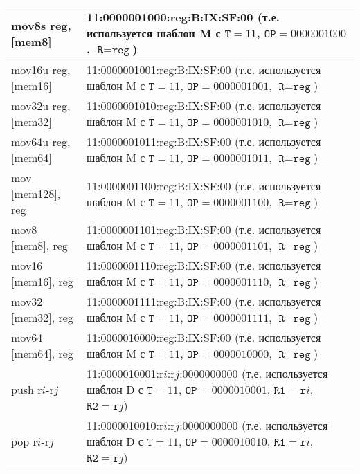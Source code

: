 \documentclass[10pt]{report}
\begin{document}
\begin{longtable}[c]{|l|p{12.5cm}|}
mov8s reg, [mem8]    & 11:0000001000:reg:B:IX:SF:00 (т.е. используется шаблон M с $\texttt{T}=11$, $\texttt{OP}=0000001000$, $\texttt{R}=\texttt{reg}$)\\ \hline
mov16u reg, [mem16]  & 11:0000001001:reg:B:IX:SF:00 (т.е. используется шаблон M с $\texttt{T}=11$, $\texttt{OP}=0000001001$, $\texttt{R}=\texttt{reg}$)\\ \hline
mov32u reg, [mem32]  & 11:0000001010:reg:B:IX:SF:00 (т.е. используется шаблон M с $\texttt{T}=11$, $\texttt{OP}=0000001010$, $\texttt{R}=\texttt{reg}$)\\ \hline
mov64u reg, [mem64]  & 11:0000001011:reg:B:IX:SF:00 (т.е. используется шаблон M с $\texttt{T}=11$, $\texttt{OP}=0000001011$, $\texttt{R}=\texttt{reg}$)\\ \hline
mov [mem128], reg    & 11:0000001100:reg:B:IX:SF:00 (т.е. используется шаблон M с $\texttt{T}=11$, $\texttt{OP}=0000001100$, $\texttt{R}=\texttt{reg}$)\\ \hline
mov8 [mem8], reg     & 11:0000001101:reg:B:IX:SF:00 (т.е. используется шаблон M с $\texttt{T}=11$, $\texttt{OP}=0000001101$, $\texttt{R}=\texttt{reg}$)\\ \hline
mov16 [mem16], reg   & 11:0000001110:reg:B:IX:SF:00 (т.е. используется шаблон M с $\texttt{T}=11$, $\texttt{OP}=0000001110$, $\texttt{R}=\texttt{reg}$)\\ \hline
mov32 [mem32], reg   & 11:0000001111:reg:B:IX:SF:00 (т.е. используется шаблон M с $\texttt{T}=11$, $\texttt{OP}=0000001111$, $\texttt{R}=\texttt{reg}$)\\ \hline
mov64 [mem64], reg   & 11:0000010000:reg:B:IX:SF:00 (т.е. используется шаблон M с $\texttt{T}=11$, $\texttt{OP}=0000010000$, $\texttt{R}=\texttt{reg}$)\\ \hline
push r$i$-r$j$       & 11:0000010001:r$i$:r$j$:0000000000 (т.е. используется шаблон D с $\texttt{T}=11$, $\texttt{OP}=0000010001$, $\texttt{R1}=\texttt{r}i$, $\texttt{R2}=\texttt{r}j$) \\ \hline
pop r$i$-r$j$        & 11:0000010010:r$i$:r$j$:0000000000 (т.е. используется шаблон D с $\texttt{T}=11$, $\texttt{OP}=0000010010$, $\texttt{R1}=\texttt{r}i$, $\texttt{R2}=\texttt{r}j$) \\ \hline
\end{longtable}
    
\end{document}
